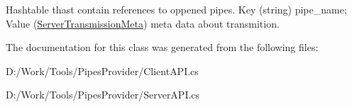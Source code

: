 Hashtable thast contain references to oppened pipes. Key (string) pipe\+\_\+name; Value (\mbox{\hyperlink{class_pipes_provider_1_1_server_transmission_meta}{Server\+Transmission\+Meta}}) meta data about transmition. 



The documentation for this class was generated from the following files\+:\begin{DoxyCompactItemize}
\item 
D\+:/\+Work/\+Tools/\+Pipes\+Provider/Client\+A\+P\+I.\+cs\item 
D\+:/\+Work/\+Tools/\+Pipes\+Provider/Server\+A\+P\+I.\+cs\end{DoxyCompactItemize}
